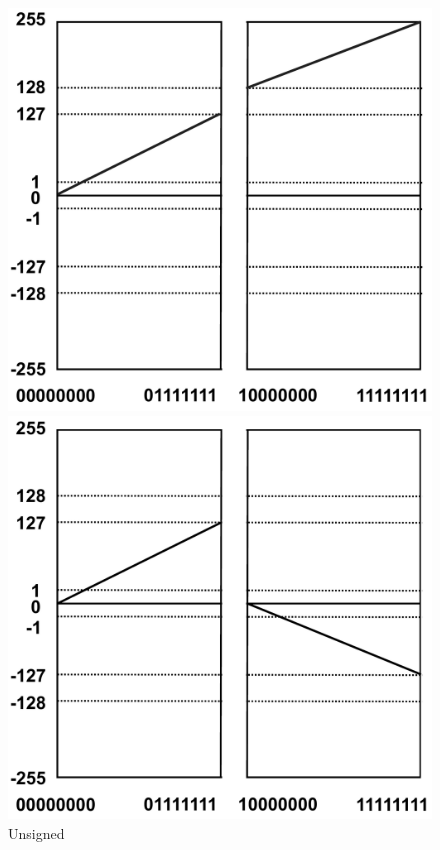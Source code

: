 \documentclass[addpoints, 12pt, answers]{exam}
\begin{document}
\begin{questions}
\begin{parts}
    
    \begin{figure}[h]
        \begin{minipage}[t]{0.35\textwidth}
        \includegraphics[width=\linewidth]{number_sample.pdf}
        \caption*{Unsigned}
        \end{minipage}        
        \hfill
        \begin{minipage}[t]{0.35\textwidth}
        \includegraphics[width=\linewidth]{number_sign_magnitude.pdf}

\end{minipage}
\end{figure}
\end{parts}
\end{questions}
\end{document}
